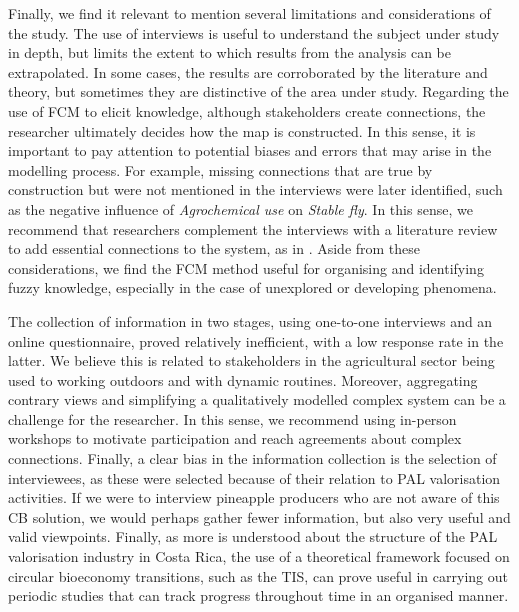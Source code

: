 Finally, we find it relevant to mention several limitations and considerations of the study. The use of interviews is useful to understand the subject under study in depth, but limits the extent to which results from the analysis can be extrapolated. In some cases, the results are corroborated by the literature and theory, but sometimes they are distinctive of the area under study. Regarding the use of FCM to elicit knowledge, although stakeholders create connections, the researcher ultimately decides how the map is constructed. In this sense, it is important to pay attention to potential biases and errors that may arise in the modelling process. For example, missing connections that are true by construction but were not mentioned in the interviews were later identified, such as the negative influence of \textit{Agrochemical use} on \textit{Stable fly}. In this sense, we recommend that researchers complement the interviews with a literature review to add essential connections to the system, as in \cite{edwards2021building}. Aside from these considerations, we find the FCM method useful for organising and identifying fuzzy knowledge, especially in the case of unexplored or developing phenomena.

The collection of information in two stages, using one-to-one interviews and an online questionnaire, proved relatively inefficient, with a low response rate in the latter. We believe this is related to stakeholders in the agricultural sector being used to working outdoors and with dynamic routines. Moreover, aggregating contrary views and simplifying a qualitatively modelled complex system can be a challenge for the researcher. In this sense, we recommend using in-person workshops to motivate participation and reach agreements about complex connections. Finally, a clear bias in the information collection is the selection of interviewees, as these were selected because of their relation to PAL valorisation activities. If we were to interview pineapple producers who are not aware of this CB solution, we would perhaps gather fewer information, but also very useful and valid viewpoints. Finally, as more is understood about the structure of the PAL valorisation industry in Costa Rica, the use of a theoretical framework focused on circular bioeconomy transitions, such as the TIS, can prove useful in carrying out periodic studies that can track progress throughout time in an organised manner. 
